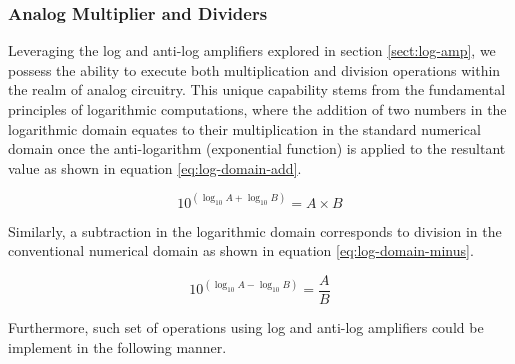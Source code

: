 \documentclass[10pt]{article}
\begin{document}
\begin{multicols*}{2}
\begin{minipage}{\linewidth}

                        \label{fig:knee-control}

                    \end{minipage}

                \subsubsection{Analog Multiplier and Dividers}
                    Leveraging the log and anti-log amplifiers explored in section \ref{sect:log-amp}, we possess the ability to execute both multiplication and division operations within the realm of analog circuitry. This unique capability stems from the fundamental principles of logarithmic computations, where the addition of two numbers in the logarithmic domain equates to their multiplication in the standard numerical domain once the anti-logarithm (exponential function) is applied to the resultant value as shown in equation \ref{eq:log-domain-add}.
                    
                        \begin{equation} \label{eq:log-domain-add}
                            10^{(\log_{10}A+\log_{10}B)}=A\times B
                        \end{equation}
                    
                    \noindent Similarly, a subtraction in the logarithmic domain corresponds to division in the conventional numerical domain as shown in equation \ref{eq:log-domain-minus}.

                        \begin{equation} \label{eq:log-domain-minus}
                            10^{(\log_{10}A-\log_{10}B)}=\frac{A}{B}
                        \end{equation}

                    \noindent Furthermore, such set of operations using log and anti-log amplifiers could be implement in the following manner.

                        \noindent
                        \begin{minipage}{\linewidth}

                            \centering


\end{minipage}
\end{multicols*}
\end{document}
